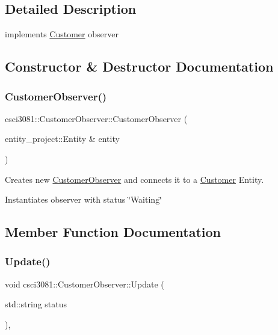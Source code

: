 \subsection{Detailed Description}
implements \hyperlink{classcsci3081_1_1Customer}{Customer} observer 

\subsection{Constructor \& Destructor Documentation}
\mbox{\label{classcsci3081_1_1CustomerObserver_aa6c907db0939e504ffabfaa0a619702e}} 
\subsubsection{\texorpdfstring{Customer\+Observer()}{CustomerObserver()}}
{\footnotesize\ttfamily csci3081\+::\+Customer\+Observer\+::\+Customer\+Observer (\begin{DoxyParamCaption}\item[{entity\+\_\+project\+::\+Entity \&}]{entity }\end{DoxyParamCaption})\hspace{0.3cm}{\ttfamily [inline]}}



Creates new \hyperlink{classcsci3081_1_1CustomerObserver}{Customer\+Observer} and connects it to a \hyperlink{classcsci3081_1_1Customer}{Customer} Entity. 

Instantiates observer with status \char`\"{}\+Waiting\char`\"{} 

\subsection{Member Function Documentation}
\mbox{\label{classcsci3081_1_1CustomerObserver_a2134ac33a6fd38951bbd979e6fd5a853}} 
\subsubsection{\texorpdfstring{Update()}{Update()}}
{\footnotesize\ttfamily void csci3081\+::\+Customer\+Observer\+::\+Update (\begin{DoxyParamCaption}\item[{std\+::string}]{status }\end{DoxyParamCaption})\hspace{0.3cm}{\ttfamily [inline]}, {\ttfamily [virtual]}}



